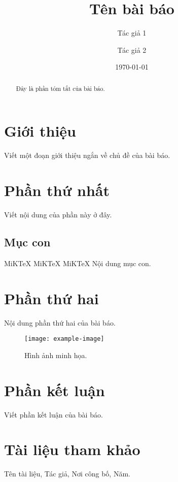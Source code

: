 \documentclass{article}
\title{Tên bài báo}
\author{Tác giả 1 \and Tác giả 2}
\date{\today}
\begin{document}
\maketitle

\begin{abstract}
Đây là phần tóm tắt của bài báo.
\end{abstract}

\tableofcontents

\section{Giới thiệu}
Viết một đoạn giới thiệu ngắn về chủ đề của bài báo.

\section{Phần thứ nhất}
Viết nội dung của phần này ở đây.

\subsection{Mục con}MiKTeX MiKTeX MiKTeX 
Nội dung mục con.

\section{Phần thứ hai}
Nội dung phần thứ hai của bài báo.

\begin{figure}
  \centering
  \texttt{[image: example-image]}
  \caption{Hình ảnh minh họa.}
  \label{fig:example}
\end{figure}

\section{Phần kết luận}
Viết phần kết luận của bài báo.

\section*{Tài liệu tham khảo}
\begin{thebibliography}{9}
 Tên tài liệu, Tác giả, Nơi công bố, Năm.
\end{thebibliography}
\end{document}
